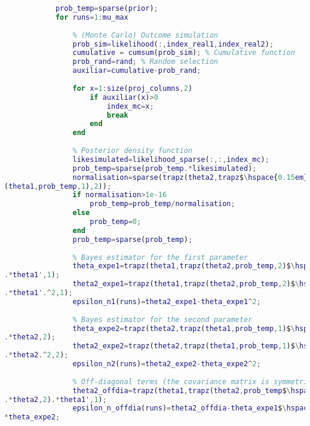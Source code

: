 \begin{lstlisting}[language=Matlab, mathescape=true]
            % Prior density function
            prob_temp=sparse(prior);
            for runs=1:mu_max
                
                % (Monte Carlo) Outcome simulation
                prob_sim=likelihood(:,index_real1,index_real2);
                cumulative = cumsum(prob_sim); % Cumulative function
                prob_rand=rand; % Random selection
                auxiliar=cumulative-prob_rand;
                
                for x=1:size(proj_columns,2)
                    if auxiliar(x)>0
                        index_mc=x;
                        break
                    end
                end
                
                % Posterior density function
                likesimulated=likelihood_sparse(:,:,index_mc);
                prob_temp=sparse(prob_temp.*likesimulated);
                normalisation=sparse(trapz(theta2,trapz$\hspace{0.15em}\swarrow$
(theta1,prob_temp,1),2));
                if normalisation>1e-16
                    prob_temp=prob_temp/normalisation;
                else
                    prob_temp=0;
                end
                prob_temp=sparse(prob_temp);
                
                % Bayes estimator for the first parameter
                theta_expe1=trapz(theta1,trapz(theta2,prob_temp,2)$\hspace{0.15em}\swarrow$
.*theta1',1);
                theta2_expe1=trapz(theta1,trapz(theta2,prob_temp,2)$\hspace{0.15em}\swarrow$
.*theta1'.^2,1);
                epsilon_n1(runs)=theta2_expe1-theta_expe1^2;
                
                % Bayes estimator for the second parameter
                theta_expe2=trapz(theta2,trapz(theta1,prob_temp,1)$\hspace{0.15em}\swarrow$
.*theta2,2);
                theta2_expe2=trapz(theta2,trapz(theta1,prob_temp,1)$\hspace{0.15em}\swarrow$
.*theta2.^2,2);
                epsilon_n2(runs)=theta2_expe2-theta_expe2^2;
                
                % Off-diagonal terms (the covariance matrix is symmetric)
                theta2_offdia=trapz(theta1,trapz(theta2,prob_temp$\hspace{0.15em}\swarrow$
.*theta2,2).*theta1',1);
                epsilon_n_offdia(runs)=theta2_offdia-theta_expe1$\hspace{0.15em}\swarrow$
*theta_expe2;


\end{lstlisting}
